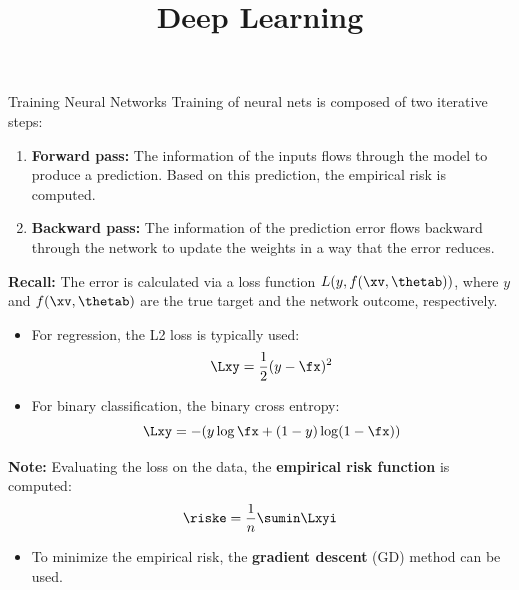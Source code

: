




\newcommand{\titlefigure}{figure/loss_surface.png}
\newcommand{\learninggoals}{
  \item Gradient descent
  \item Stochastic gradient descent
  \item Minibatch gradient descent
  \item Learning rates and (S)GD specifics
}

\title{Deep Learning}
\date{}




\begin{vbframe}{Training Neural Networks}
\lz
Training of neural nets is composed of two iterative steps:
\lz
\begin{enumerate}
\item \textbf{Forward pass:} The information of the inputs flows through the model to produce a prediction. Based on this prediction, the empirical risk is computed.
\lz
\item \textbf{Backward pass:} The information of the prediction error flows backward through the network to update the weights in a way that the error reduces.
\end{enumerate}
\lz

\textbf{Recall:} The error is calculated via a loss function $L(y, f(\xv, \thetab))$, where $y$ and $f(\xv, \thetab)$ are the true target and the network outcome, respectively.
\framebreak

\lz
\lz
\begin{itemize}
\item For regression, the L2 loss is typically used:
$$\Lxy = \frac{1}{2}(y - \fx)^2$$
\item For binary classification, the binary cross entropy:
$$\Lxy = - (y \log \fx + (1 - y) \log(1 - \fx))$$
\end{itemize}
\lz
\textbf{Note:} Evaluating the loss on the data, the \textbf{empirical risk function} is computed:
$$\riske = \frac{1}{n} \sumin \Lxyi$$
\begin{itemize}
 \item To minimize the empirical risk, the \textbf{gradient descent} (GD) method can be used.
\end{itemize}
\end{vbframe}


